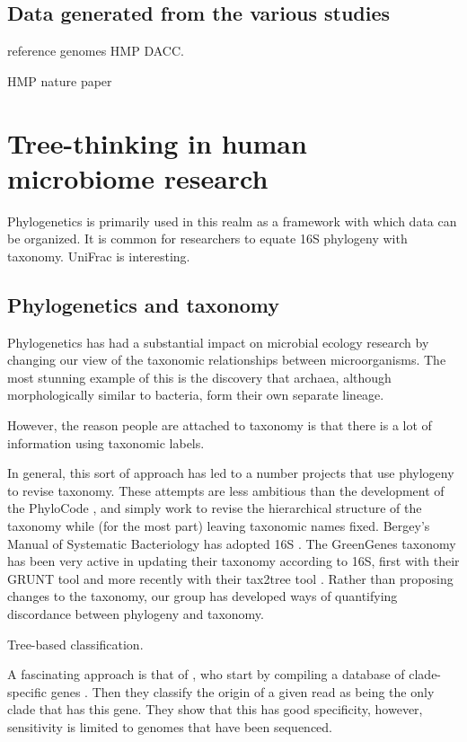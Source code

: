 \documentclass{amsart}
\begin{document}
\subsection{Data generated from the various studies}
reference genomes
HMP DACC.

HMP nature paper
\cite{methe2012framework}



\section{Tree-thinking in human microbiome research}

Phylogenetics is primarily used in this realm as a framework with which data can be organized.
It is common for researchers to equate 16S phylogeny with taxonomy.
UniFrac is interesting.

\subsection{Phylogenetics and taxonomy}

Phylogenetics has had a substantial impact on microbial ecology research by changing our view of the taxonomic relationships between microorganisms.
The most stunning example of this is the discovery that archaea, although morphologically similar to bacteria, form their own separate lineage.

However, the reason people are attached to taxonomy is that there is a lot of information using taxonomic labels.

In general, this sort of approach has led to a number projects that use phylogeny to revise taxonomy.
These attempts are less ambitious than the development of the PhyloCode \cite{forey2001phylocode}, and simply work to revise the hierarchical structure of the taxonomy while (for the most part) leaving taxonomic names fixed.
Bergey's Manual of Systematic Bacteriology has adopted 16S \cite{kreig1984bergey}.
The GreenGenes taxonomy \cite{desantis2006greengenes} has been very active in updating their taxonomy according to 16S, first with their GRUNT tool \cite{dalevi2007automated} and more recently with their tax2tree tool \cite{mcdonald2011improved}.
Rather than proposing changes to the taxonomy, our group \cite{matsen2011reconciling} has developed ways of quantifying discordance between phylogeny and taxonomy.

Tree-based classification.
\cite{bazinet2012comparative}

A fascinating approach is that of \citet{segata2012metagenomic}, who start by compiling a database of clade-specific genes \citep{segata2011metagenomic}.
Then they classify the origin of a given read as being the only clade that has this gene.
They show that this has good specificity, however, sensitivity is limited to genomes that have been sequenced.
\end{document}
